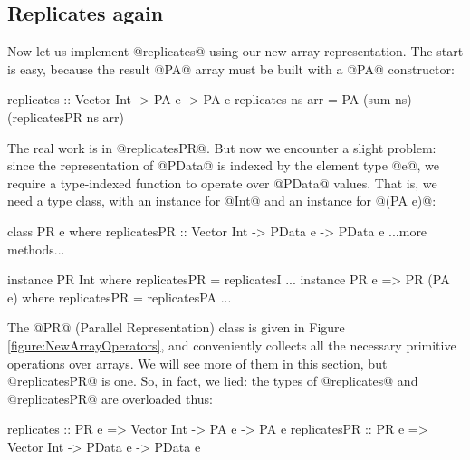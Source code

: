 \subsection{Replicates again}
\label{section:Replicates}
Now let us implement @replicates@ using our new array representation. The start is easy, because the result @PA@ array must be built with a @PA@ constructor:
\par
\begin{small}
\begin{code}
 replicates :: Vector Int -> PA e -> PA e
 replicates ns arr = PA (sum ns) (replicatesPR ns arr)
\end{code}
\end{small}
\par
\noindent
The real work is in @replicatesPR@.  But now we encounter a slight problem: since the representation of @PData@ is indexed by the element type @e@, we require a type-indexed function to operate over @PData@ values.  That is, we need a type class, with an instance for @Int@ and an instance for @(PA e)@:
\begin{small}
\begin{code}
 class PR e where
   replicatesPR :: Vector Int -> PData e -> PData e
   ...more methods...

 instance PR Int where
   replicatesPR = replicatesI
   ...
 instance PR e => PR (PA e) where
   replicatesPR = replicatesPA
   ...
\end{code}
\end{small}
The @PR@ (Parallel Representation) class is given in Figure \ref{figure:NewArrayOperators}, and conveniently collects all the necessary primitive operations over arrays.  We will see more of them in this section, but @replicatesPR@ is one. So, in fact, we lied: the types of @replicates@ and @replicatesPR@ are overloaded thus:
\par
%
\begin{small}
\begin{code}
 replicates   :: PR e => Vector Int -> PA e    -> PA e
 replicatesPR :: PR e => Vector Int -> PData e -> PData e
\end{code}
\end{small}
\par
